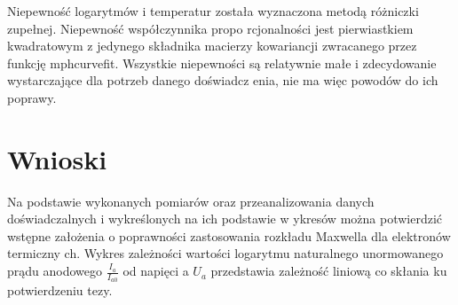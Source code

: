 \documentclass[a4paper,10pt]{article}
\begin{document}
Niepewność logarytmów i temperatur została wyznaczona metodą różniczki zupełnej. Niepewność współczynnika propo
rcjonalności jest pierwiastkiem kwadratowym z jedynego składnika macierzy kowariancji zwracanego przez funkcję \e
mph{curvefit}. Wszystkie niepewności są relatywnie małe i zdecydowanie wystarczające dla potrzeb danego doświadcz
enia, nie ma więc powodów do ich poprawy.
 \section{Wnioski}
 Na podstawie wykonanych pomiarów oraz przeanalizowania danych doświadczalnych i wykreślonych na ich podstawie w
ykresów można potwierdzić wstępne założenia o poprawności zastosowania rozkładu Maxwella dla elektronów termiczny
ch. Wykres zależności wartości logarytmu naturalnego unormowanego prądu anodowego $\frac{I_a}{I_{a0}}$ od napięci
a $U_a$ przedstawia zależność liniową co skłania ku potwierdzeniu tezy.
 
\end{document}
